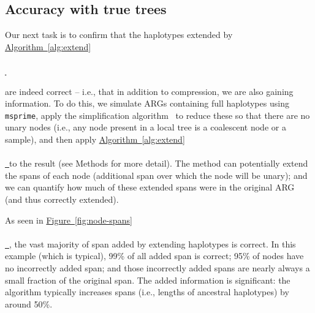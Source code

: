 \documentclass[10pt,twoside,lineno]{gsajnl}
\newcommand{\msprime}{\texttt{msprime}}
\newcommand{\algorithmref}[2][]{%
	\hyperref[{#2}]{%
		Algorithm~\ref*{#2}%
		\ifx\\#1\\%
		\else
		\,#1%
		\fi
	}%
}
\newcommand*{\figref}[2][]{%
	\hyperref[{#2}]{%
		Figure~\ref*{#2}%
		\ifx\\#1\\%
		\else
		\,#1%
		\fi
	}%
}
\begin{document}
\subsection{Accuracy with true trees}


Our next task is to confirm that the haplotypes extended by \algorithmref{alg:extend}
are indeed correct -- i.e., that in addition to compression, we are also gaining information.
To do this, 
we simulate ARGs containing full haplotypes using \msprime{},
apply the simplification algorithm~\citep{kelleher2018efficient,wong2024general}
to reduce these so that there are no unary nodes
(i.e., any node present in a local tree is a coalescent node or a sample),
and then apply \algorithmref{alg:extend} to the result
(see Methods for more detail).
The method can potentially extend the spans of each node
(additional span over which the node will be unary);
and we can quantify how much of these extended spans were in the original ARG
(and thus correctly extended).

%
%

As seen in \figref{fig:node-spans},
the vast majority of span added by extending haplotypes is correct.
In this example (which is typical),
99\% of all added span is correct;
95\% of nodes have no incorrectly added span;
and those incorrectly added spans are nearly always a small fraction of the original span.
The added information is significant:
the algorithm typically increases spans (i.e., lengths of ancestral haplotypes)
by around 50\%.
\end{document}
